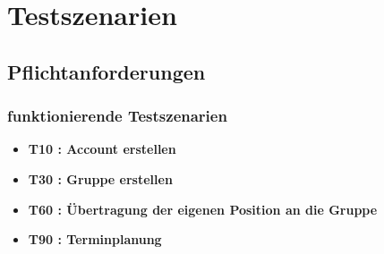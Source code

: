 \documentclass[parskip=full,11pt]{scrartcl}
\begin{document}
\section{Testszenarien}

	\subsection{Pflichtanforderungen}
		\subsubsection{funktionierende Testszenarien}
			\begin{itemize}
				\item \textbf{T10 : Account erstellen}
				\item \textbf{T30 : Gruppe erstellen}
				\item \textbf{T60 : Übertragung der eigenen Position an die Gruppe}
				\item \textbf{T90 : Terminplanung}
			\end{itemize}
\end{document}
